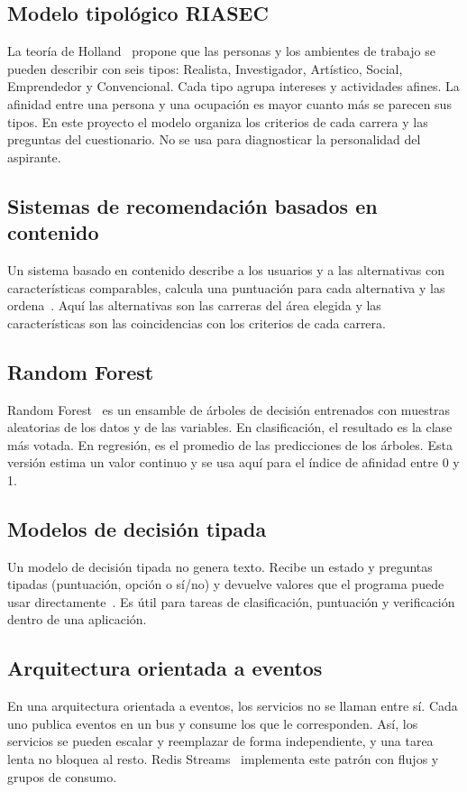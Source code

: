 \subsection{Modelo tipológico RIASEC}
La teoría de Holland~\cite{Holland1997} propone que las personas y los ambientes de trabajo se pueden describir con seis tipos: Realista, Investigador, Artístico, Social, Emprendedor y Convencional. Cada tipo agrupa intereses y actividades afines. La afinidad entre una persona y una ocupación es mayor cuanto más se parecen sus tipos. En este proyecto el modelo organiza los criterios de cada carrera y las preguntas del cuestionario. No se usa para diagnosticar la personalidad del aspirante.

\subsection{Sistemas de recomendación basados en contenido}
Un sistema basado en contenido describe a los usuarios y a las alternativas con características comparables, calcula una puntuación para cada alternativa y las ordena~\cite{GoogleContentBased2025}. Aquí las alternativas son las carreras del área elegida y las características son las coincidencias con los criterios de cada carrera.

\subsection{Random Forest}
Random Forest~\cite{Breiman2001} es un ensamble de árboles de decisión entrenados con muestras aleatorias de los datos y de las variables. En clasificación, el resultado es la clase más votada. En regresión, es el promedio de las predicciones de los árboles. Esta versión estima un valor continuo y se usa aquí para el índice de afinidad entre 0 y 1.

\subsection{Modelos de decisión tipada}
Un modelo de decisión tipada no genera texto. Recibe un estado y preguntas tipadas (puntuación, opción o sí/no) y devuelve valores que el programa puede usar directamente~\cite{JevAPI2026}. Es útil para tareas de clasificación, puntuación y verificación dentro de una aplicación.

\subsection{Arquitectura orientada a eventos}
En una arquitectura orientada a eventos, los servicios no se llaman entre sí. Cada uno publica eventos en un bus y consume los que le corresponden. Así, los servicios se pueden escalar y reemplazar de forma independiente, y una tarea lenta no bloquea al resto. Redis Streams~\cite{RedisStreams} implementa este patrón con flujos y grupos de consumo.

